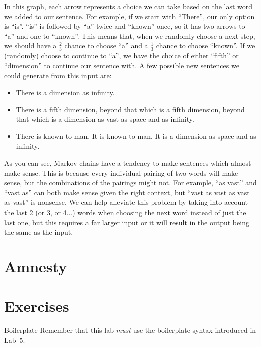 \documentclass[11pt]{cselabheader}
\begin{document}
In this graph, each arrow represents a choice we can take based on the last word we added to our sentence. For example, if we start with ``There'', our only option is ``is''. ``is'' is followed by ``a'' twice and ``known'' once, so it has two arrows to ``a'' and one to ``known''. This means that, when we randomly choose a next step, we should have a $\frac{2}{3}$ chance to choose ``a'' and a $\frac{1}{3}$ chance to choose ``known''. If we (randomly) choose to continue to ``a'', we have the choice of either ``fifth'' or ``dimension'' to continue our sentence with. A few possible new sentences we could generate from this input are:
\begin{itemize}
\item There is a dimension as infinity.
\item There is a fifth dimension, beyond that which is a fifth dimension, beyond that which is a dimension as vast as space and as infinity.
\item There is known to man. It is known to man. It is a dimension as space and as infinity.
\end{itemize}

As you can see, Markov chains have a tendency to make sentences which almost make sense. This is because every individual pairing of two words will make sense, but the combinations of the pairings might not. For example, ``as vast'' and ``vast as'' can both make sense given the right context, but ``vast as vast as vast as vast'' is nonsense. We can help alleviate this problem by taking into account the last 2 (or 3, or 4...) words when choosing the next word instead of just the last one, but this requires a far larger input or it will result in the output being the same as the input.


\section{Amnesty}
\label{sec:amnesty}


\pagebreak

\section{Exercises}
\label{sec:ex}

\begin{warningbox}{Boilerplate}
  Remember that this lab \emph{must} use the
  boilerplate syntax introduced in Lab~5.
\end{warningbox}
\end{document}
